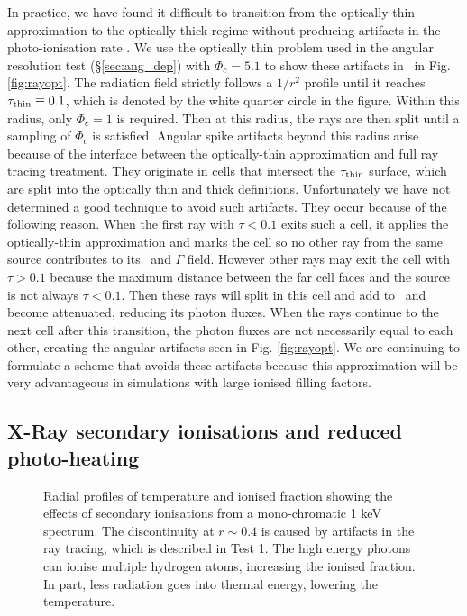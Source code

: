 \documentclass[useAMS,usenatbib]{mn2e}
\begin{document}
In practice, we have found it difficult to transition from the
optically-thin approximation to the optically-thick regime without
producing artifacts in the photo-ionisation rate \kph.  We use the
optically thin problem used in the angular resolution test
(\S\ref{sec:ang_dep}) with $\Phi_c = 5.1$ to show these artifacts in
\kph~in Fig. \ref{fig:rayopt}.  The radiation field strictly follows
a $1/r^2$ profile until it reaches $\tau_{\rm thin} \equiv 0.1$, which
is denoted by the white quarter circle in the figure.  Within this
radius, only $\Phi_c = 1$ is required.  Then at this radius, the rays
are then split until a sampling of $\Phi_c$ is satisfied.  Angular
spike artifacts beyond this radius arise because of the interface
between the optically-thin approximation and full ray tracing
treatment.  They originate in cells that intersect the $\tau_{\rm
  thin}$ surface, which are split into the optically thin and thick
definitions.  Unfortunately we have not determined a good technique to
avoid such artifacts.  They occur because of the following reason.
When the first ray with $\tau < 0.1$ exits such a cell, it applies the
optically-thin approximation and marks the cell so no other ray from
the same source contributes to its \kph~and $\Gamma$ field.  However
other rays may exit the cell with $\tau > 0.1$ because the maximum
distance between the far cell faces and the source is not always $\tau
< 0.1$.  Then these rays will split in this cell and add to \kph~and
become attenuated, reducing its photon fluxes.  When the rays continue
to the next cell after this transition, the photon fluxes are not
necessarily equal to each other, creating the angular artifacts seen
in Fig. \ref{fig:rayopt}.  We are continuing to formulate a scheme
that avoids these artifacts because this approximation will be very
advantageous in simulations with large ionised filling factors.

\subsection{X-Ray secondary ionisations and reduced photo-heating}

\begin{figure}
  \caption{\label{fig:xray_fig} Radial profiles of temperature and
    ionised fraction showing the effects of secondary ionisations from
    a mono-chromatic 1 keV spectrum.  The discontinuity at $r \sim
    0.4$ is caused by artifacts in the ray tracing, which is described
    in Test 1.  The high energy photons can ionise multiple hydrogen
    atoms, increasing the ionised fraction.  In part, less radiation
    goes into thermal energy, lowering the temperature.}
\end{figure}
\end{document}
